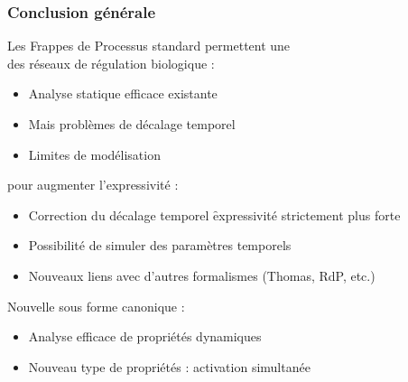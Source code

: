 
\begin{frame}[c]
  \frametitle{Conclusion générale}

Les Frappes de Processus standard permettent une \\
des réseaux de régulation biologique :
\begin{itemize}
  \item Analyse statique efficace existante
  \item Mais problèmes de décalage temporel
  \item Limites de modélisation
\end{itemize}

\medskip
{} pour augmenter l'expressivité :
\begin{itemize}
  \item Correction du décalage temporel \f expressivité strictement plus forte
  \item Possibilité de simuler des paramètres temporels
  \item Nouveaux liens avec d'autres formalismes (Thomas, RdP, etc.)
\end{itemize}

\medskip
Nouvelle  sous forme canonique :
\begin{itemize}
  \item Analyse efficace de propriétés dynamiques
  \item Nouveau type de propriétés : activation simultanée
\end{itemize}


\end{frame}
